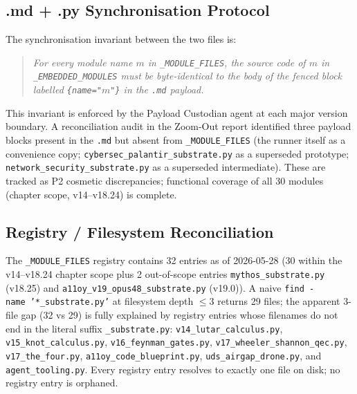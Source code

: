 \subsection{.md + .py Synchronisation Protocol}
\label{ssec:md-py-sync}

The synchronisation invariant between the two files is:

\begin{quote}
  \emph{For every module name \(m\) in \texttt{\_MODULE\_FILES}, the source
  code of \(m\) in \texttt{\_EMBEDDED\_MODULES} must be byte-identical to
  the body of the fenced block labelled \texttt{\{name="}\(m\)\texttt{"\}}
  in the \texttt{.md} payload.}
\end{quote}

This invariant is enforced by the Payload Custodian agent at each major
version boundary.  A reconciliation audit in the Zoom-Out report identified
three payload blocks present in the \texttt{.md} but absent from
\texttt{\_MODULE\_FILES} (the runner itself as a convenience copy;
\texttt{cybersec\_palantir\_substrate.py} as a superseded prototype;
\texttt{network\_security\_substrate.py} as a superseded intermediate).
These are tracked as P2 cosmetic discrepancies; functional coverage of all
30 modules (chapter scope, v14--v18.24) is complete.

\subsection{Registry / Filesystem Reconciliation}
\label{ssec:registry-fs-reconciliation}

The \texttt{\_MODULE\_FILES} registry contains 32 entries as of 2026-05-28
(30 within the v14--v18.24 chapter scope plus 2 out-of-scope entries
\texttt{mythos\_substrate.py} (v18.25) and
\texttt{a11oy\_v19\_opus48\_substrate.py} (v19.0)).  A naive
\texttt{find}~\texttt{-name}~\texttt{'*\_substrate.py'} at filesystem depth
$\leq 3$ returns 29 files; the apparent 3-file gap (32 vs 29) is fully
explained by registry entries whose filenames do not end in the literal
suffix \texttt{\_substrate.py}: \texttt{v14\_lutar\_calculus.py},
\texttt{v15\_knot\_calculus.py}, \texttt{v16\_feynman\_gates.py},
\texttt{v17\_wheeler\_shannon\_qec.py}, \texttt{v17\_the\_four.py},
\texttt{a11oy\_code\_blueprint.py}, \texttt{uds\_airgap\_drone.py}, and
\texttt{agent\_tooling.py}.  Every registry entry resolves to exactly one
file on disk; no registry entry is orphaned.

